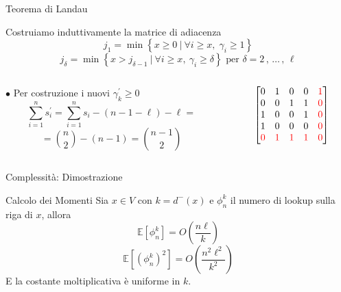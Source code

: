 \documentclass{beamer}
\begin{document}
\begin{frame}{Teorema di Landau}
	\begin{block}{Costruiamo induttivamente la matrice di adiacenza}
		$$ j_1 = \min \left\{x \geq 0 \: \big| \: \forall i \geq x,  \; \gamma_i \geq 1 \right\} $$
		$$ j_\delta = \min\left\{x > j_{\delta-1} \: \big| \: \forall i \geq x,  \ \gamma_i \geq \delta \right\} \text{ per } \delta = 2\, , \, \dots \,, \, \ell $$
		\vspace{3mm}
	\end{block}
	\vspace{2mm}
	\begin{columns}
		\begin{column}{0.6 \textwidth}
			\hspace{8mm} $\bullet$ Per costruzione i nuovi $\gamma_k^\prime \geq 0 $ \\
			$$ \sum_{i = 1}^n s_i^\prime = \sum_{i = 1}^n s_i - (n - 1 - \ell) - \ell = $$
			$$ = \binom{n}{2} - (n - 1) = \binom{n-1}{2} $$
			\vspace{8mm}
		\end{column}
		\begin{column}{0.4 \textwidth}
			\[
			\begin{bmatrix}
				0 & 1 & 0 & 0 & \color{red}1 \\
				0 & 0 & 1 & 1 & \color{red}0 \\
				1 & 0 & 0 & 1 & \color{red}0 \\
				1 & 0 & 0 & 0 & \color{red}0 \\
				\color{red}0 & \color{red}1 & \color{red}1 & \color{red}1 & \color{red}0 \\

		    \end{bmatrix}
			\]
		\end{column}
	\end{columns}
\end{frame}

\begin{frame}{Complessità: Dimostrazione}
	\begin{block}{Calcolo dei Momenti}
		Sia $x \in V$ con $k = d^-(x)$ e $\phi_n^k$ il numero di lookup sulla riga di $x$, allora
		$$ \mathbb{E}\left[\phi_n^k\right] = O\left(\frac{n\ell}{k}\right) $$
		$$ \mathbb{E}\left[\left({\phi_n^k}\right)^2\right] = O\left(\frac{n^2\ell^2}{k^2}\right) $$
		E la costante moltiplicativa è uniforme in $k$.
	\end{block}
\end{frame}
\end{document}
